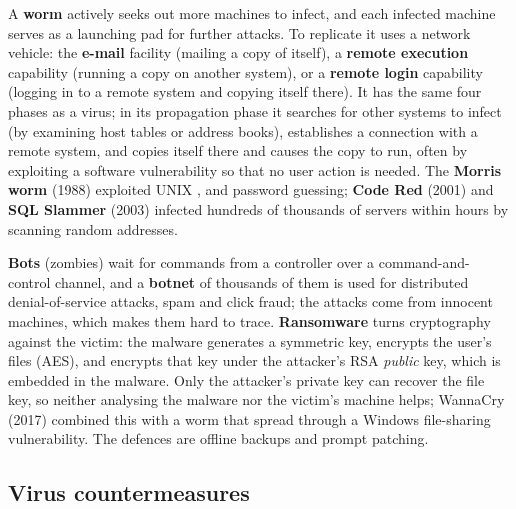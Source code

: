 A \textbf{worm} actively seeks out more machines to infect, and each infected machine serves as a launching pad for further attacks. To replicate it uses a network vehicle: the \textbf{e-mail} facility (mailing a copy of itself), a \textbf{remote execution} capability (running a copy on another system), or a \textbf{remote login} capability (logging in to a remote system and copying itself there). It has the same four phases as a virus; in its propagation phase it searches for other systems to infect (by examining host tables or address books), establishes a connection with a remote system, and copies itself there and causes the copy to run, often by exploiting a software vulnerability so that no user action is needed. The \textbf{Morris worm} (1988) exploited UNIX ,  and password guessing; \textbf{Code Red} (2001) and \textbf{SQL Slammer} (2003) infected hundreds of thousands of servers within hours by scanning random addresses.

\textbf{Bots} (zombies) wait for commands from a controller over a command-and-control channel, and a \textbf{botnet} of thousands of them is used for distributed denial-of-service attacks, spam and click fraud; the attacks come from innocent machines, which makes them hard to trace. \textbf{Ransomware} turns cryptography against the victim: the malware generates a symmetric key, encrypts the user's files (AES), and encrypts that key under the attacker's RSA \emph{public} key, which is embedded in the malware. Only the attacker's private key can recover the file key, so neither analysing the malware nor the victim's machine helps; WannaCry (2017) combined this with a worm that spread through a Windows file-sharing vulnerability. The defences are offline backups and prompt patching.

\subsection{Virus countermeasures \new}


